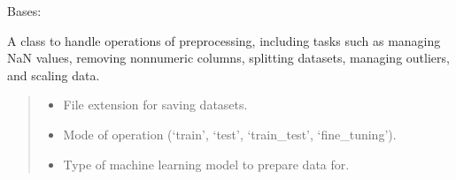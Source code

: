 \documentclass[letterpaper,10pt,english]{sphinxmanual}
\begin{document}
\begin{fulllineitems}
\label{\detokenize{docs/data_preprocessing:data_preprocessing.DataPreprocessor}}
\pysigstartsignatures
{}
\pysigstopsignatures
\sphinxAtStartPar
Bases: 

\sphinxAtStartPar
A class to handle operations of preprocessing, including tasks such as managing NaN values,
removing non\sphinxhyphen{}numeric columns, splitting datasets, managing outliers, and scaling data.
\begin{quote}\begin{description}
\begin{itemize}
\item {} 
\sphinxAtStartPar
{} \textendash{} File extension for saving datasets.

\item {} 
\sphinxAtStartPar
{} \textendash{} Mode of operation (‘train’, ‘test’, ‘train\_test’, ‘fine\_tuning’).

\item {} 
\sphinxAtStartPar
{} \textendash{} Type of machine learning model to prepare data for.


\end{itemize}
\end{description}
\end{quote}
\end{fulllineitems}
\end{document}
